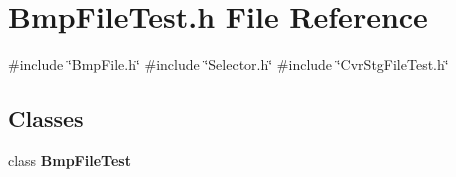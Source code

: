 \section{Bmp\+File\+Test.\+h File Reference}
\label{BmpFileTest_8h}
{\ttfamily \#include \char`\"{}Bmp\+File.\+h\char`\"{}}\newline
{\ttfamily \#include \char`\"{}Selector.\+h\char`\"{}}\newline
{\ttfamily \#include \char`\"{}Cvr\+Stg\+File\+Test.\+h\char`\"{}}\newline
\subsection*{Classes}
\begin{DoxyCompactItemize}
\item 
class \textbf{ Bmp\+File\+Test}
\end{DoxyCompactItemize}
